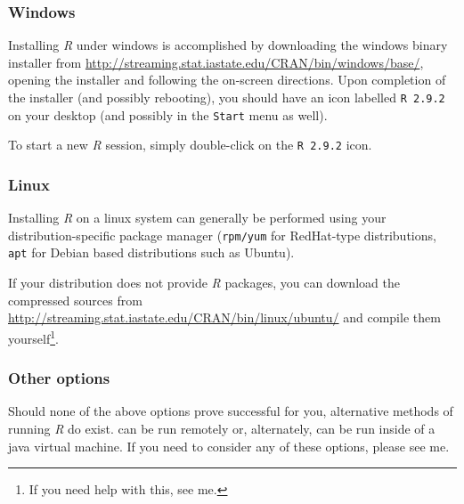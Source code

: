 \documentclass[10pt,letterpaper]{article}
\begin{document}

\subsubsection{Windows} %
\label{ssub:windows}

Installing \emph{R} under windows is accomplished by downloading the windows binary installer from \url{http://streaming.stat.iastate.edu/CRAN/bin/windows/base/}, opening the installer and following the on-screen directions.  Upon completion of the installer (and possibly rebooting), you should have an icon labelled \texttt{R 2.9.2} on your desktop (and possibly in the \texttt{Start} menu as well).

To start a new \emph{R} session, simply double-click on the \texttt{R 2.9.2} icon.

\subsubsection{Linux} %
\label{ssub:linux}

Installing \emph{R} on a linux system can generally be performed using your distribution-specific package manager (\texttt{rpm/yum} for RedHat-type distributions, \texttt{apt} for Debian based distributions such as Ubuntu).

If your distribution does not provide \emph{R} packages, you can download the compressed sources from \url{http://streaming.stat.iastate.edu/CRAN/bin/linux/ubuntu/} and compile them yourself\footnote{If you need help with this, see me.}.




\subsubsection{Other options} %
\label{ssub:other_options}

Should none of the above options prove successful for you, alternative methods of running \emph{R} do exist.  \R can be run remotely or, alternately, can be run inside of a java virtual machine.  If you need to consider any of these options, please see me.


\end{document}
